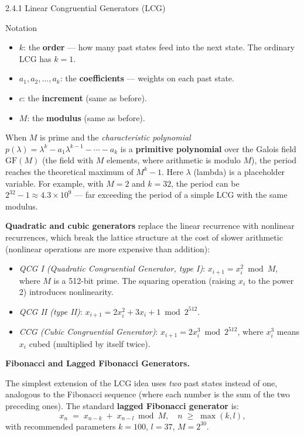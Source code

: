 \documentclass[aspectratio=169,10pt]{beamer}
\begin{document}
\begin{frame}[allowframebreaks]{2.4.1 Linear Congruential Generators (LCG)}
\begin{block}{Notation}
\begin{itemize}
  \item $k$: the \textbf{order} --- how many past states feed into the
    next state.  The ordinary LCG has $k=1$.
  \item $a_1, a_2, \ldots, a_k$: the \textbf{coefficients} --- weights
    on each past state.
  \item $c$: the \textbf{increment} (same as before).
  \item $M$: the \textbf{modulus} (same as before).
\end{itemize}
When $M$ is prime and the \emph{characteristic polynomial}
$p(\lambda) = \lambda^k - a_1\lambda^{k-1} - \cdots - a_k$ is a
\textbf{primitive polynomial} over the Galois field $\mathrm{GF}(M)$
(the field with $M$ elements, where arithmetic is modulo $M$), the period
reaches the theoretical maximum of $M^k - 1$.  Here $\lambda$ (lambda)
is a placeholder variable.  For example, with $M = 2$ and $k = 32$,
the period can be $2^{32} - 1 \approx 4.3 \times 10^9$ --- far exceeding
the period of a simple LCG with the same modulus.
\end{block}

\medskip
\textbf{Quadratic and cubic generators} replace the linear recurrence with
nonlinear recurrences, which break the lattice structure at the cost of
slower arithmetic (nonlinear operations are more expensive than addition):
\begin{itemize}
  \item \emph{QCG I (Quadratic Congruential Generator, type I)}:
    $x_{i+1} = x_i^2 \bmod M$, where $M$ is a 512-bit prime.  The
    squaring operation (raising $x_i$ to the power 2) introduces nonlinearity.
  \item \emph{QCG II (type II)}: $x_{i+1} = 2x_i^2 + 3x_i + 1 \bmod 2^{512}$.
  \item \emph{CCG (Cubic Congruential Generator)}: $x_{i+1} = 2x_i^3 \bmod 2^{512}$,
    where $x_i^3$ means $x_i$ cubed (multiplied by itself twice).
\end{itemize}

\framebreak

\textbf{Fibonacci and Lagged Fibonacci Generators.}

The simplest extension of the LCG idea uses \emph{two} past states instead of
one, analogous to the Fibonacci sequence (where each number is the sum of the
two preceding ones).  The standard \textbf{lagged Fibonacci generator} is:
\[
  x_n \;=\; x_{n-k} \;+\; x_{n-l} \bmod M, \quad n \;\ge\; \max(k, l),
\]
with recommended parameters $k = 100$, $l = 37$, $M = 2^{30}$.


\end{frame}
\end{document}

